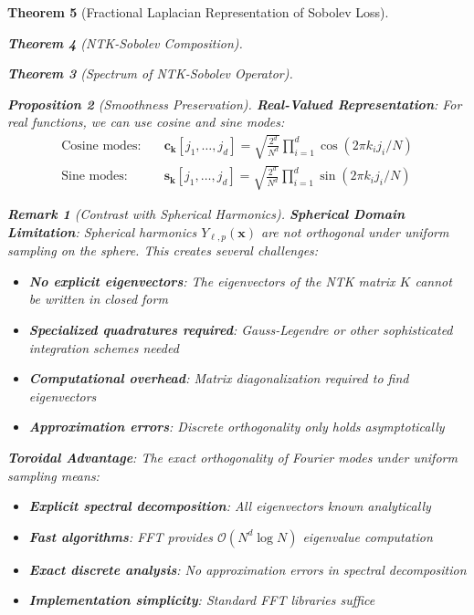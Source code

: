\documentclass{article}
\newtheorem{theorem}{Theorem}[section]
\newtheorem{proposition}[theorem]{Proposition}
\newtheorem{remark}[theorem]{Remark}
\begin{document}
\begin{theorem}[Fractional Laplacian Representation of Sobolev Loss]
\begin{theorem}[NTK-Sobolev Composition]
\begin{theorem}[Spectrum of NTK-Sobolev Operator]
\begin{proposition}[Smoothness Preservation]
\textbf{Real-Valued Representation}:
For real functions, we can use cosine and sine modes:
\begin{align}
\text{Cosine modes:} \quad &\mathbf{c}_{\mathbf{k}}[j_1, \ldots, j_d] = \sqrt{\frac{2^d}{N^d}} \prod_{i=1}^d \cos(2\pi k_i j_i/N) \\
\text{Sine modes:} \quad &\mathbf{s}_{\mathbf{k}}[j_1, \ldots, j_d] = \sqrt{\frac{2^d}{N^d}} \prod_{i=1}^d \sin(2\pi k_i j_i/N)
\end{align}

\begin{remark}[Contrast with Spherical Harmonics]
\textbf{Spherical Domain Limitation}: Spherical harmonics $Y_{\ell,p}(\mathbf{x})$ are \emph{not} orthogonal under uniform sampling on the sphere. This creates several challenges:

\begin{itemize}
\item \textbf{No explicit eigenvectors}: The eigenvectors of the NTK matrix $K$ cannot be written in closed form
\item \textbf{Specialized quadratures required}: Gauss-Legendre or other sophisticated integration schemes needed
\item \textbf{Computational overhead}: Matrix diagonalization required to find eigenvectors
\item \textbf{Approximation errors}: Discrete orthogonality only holds asymptotically
\end{itemize}

\textbf{Toroidal Advantage}: The exact orthogonality of Fourier modes under uniform sampling means:
\begin{itemize}
\item \textbf{Explicit spectral decomposition}: All eigenvectors known analytically
\item \textbf{Fast algorithms}: FFT provides $\mathcal{O}(N^d \log N)$ eigenvalue computation
\item \textbf{Exact discrete analysis}: No approximation errors in spectral decomposition
\item \textbf{Implementation simplicity}: Standard FFT libraries suffice
\end{itemize}
\end{remark}


\end{proposition}
\end{theorem}
\end{theorem}
\end{theorem}
\end{document}
